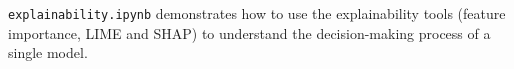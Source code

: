 \texttt{explainability.ipynb} demonstrates how to use the explainability tools (feature importance, LIME and SHAP) to understand the decision-making process of a single model.
\inputminted[fontsize=\footnotesize,linenos,breaklines=true,breakanywhere=true,frame=lines,baselinestretch=1]{python}{../examples/explainability.py}
